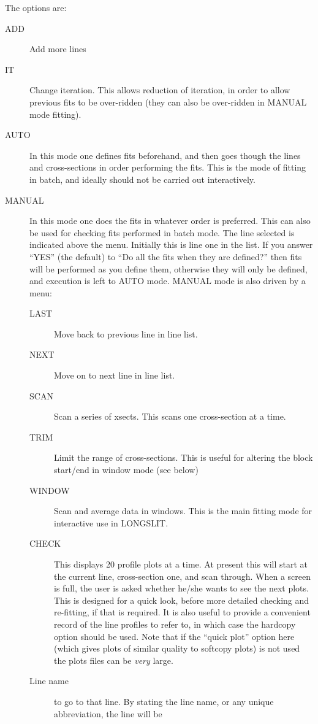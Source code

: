 The options are:
\begin{description}
\item[ADD] Add more lines
\item[IT] Change iteration.
This allows reduction of iteration, in order to allow previous fits to
be over-ridden (they can also be over-ridden in MANUAL mode fitting). 
\item[AUTO] In this mode one defines fits beforehand, and then goes
though the lines and cross-sections in order performing the fits.
This is the mode of fitting in batch, and ideally should not be carried
out interactively.
\item[MANUAL] In this mode one does the fits in whatever order is
preferred.
This can also be used for checking fits performed in batch mode.
The line selected is indicated above the menu.
Initially this is line one in the list.
If you answer ``YES'' (the default) to ``Do all the fits when they are
defined?'' then fits will be performed as you define them, otherwise
they will only be defined, and execution is left to AUTO mode.
MANUAL mode is also driven by a menu:\\
\begin{description}
\item[LAST] Move back to previous line in line list.
\item[NEXT] Move on to next line in line list.
\item[SCAN] Scan a series of xsects.
This scans one cross-section at a time.
\item[TRIM] Limit the range of cross-sections.
This is useful for altering the block start/end in window mode (see
below)
\item[WINDOW] Scan and average data in windows.
This is the main fitting mode for interactive use in LONGSLIT. 
\item[CHECK] This displays 20 profile plots at a time.
At present this will start at the current line, cross-section one, and
scan through.
When a screen is full, the user is asked whether he/she wants to see the
next plots.
This is designed for a quick look, before more detailed checking and
re-fitting, if that is required.
It is also useful to provide a convenient record of the line profiles to
refer to, in which case the hardcopy option should be used. Note that
if the ``quick plot'' option here (which gives plots of similar quality
to softcopy plots) is not used the plots files can be {\em very} large.
\item[Line name] to go to that line.
By stating the line name, or any unique abbreviation, the line will be

\end{description}
\end{description}
